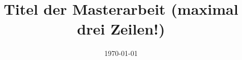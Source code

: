 \documentclass[
  type=MA, %
  lang=german, %
  study=Bau, %
  uni=LFUI, %
  expose=true, %
  explanation=true, %
  specialization=BBP, %
]{ftwthesis}
\title{Titel der Masterarbeit (maximal drei Zeilen!)}
\date{\today}
\begin{document}
\tableofcontents*\cleardoublepage

\listoffigures\cleardoublepage

\listoftables\cleardoublepage



\FTWBlindDocument



\end{document}
